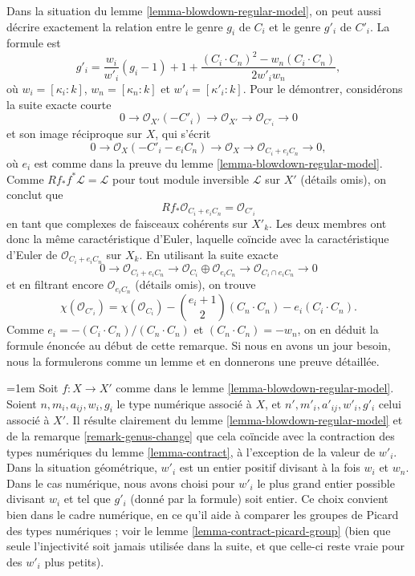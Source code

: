 \begin{remark}
\label{remark-genus-change}
Dans la situation du lemme \ref{lemma-blowdown-regular-model}, on peut aussi
décrire exactement la relation entre le genre $g_i$ de $C_i$ et le genre
$g'_i$ de $C'_i$. La formule est
$$
g'_i = \frac{w_i}{w'_i}(g_i - 1) + 1 +
\frac{(C_i \cdot C_n)^2 - w_n(C_i \cdot C_n)}{2w'_iw_n},
$$
où $w_i = [\kappa_i : k]$, $w_n = [\kappa_n : k]$ et
$w'_i = [\kappa'_i : k]$.
Pour le démontrer, considérons la suite exacte courte
$$
0 \to \mathcal{O}_{X'}(-C'_i) \to \mathcal{O}_{X'} \to
\mathcal{O}_{C'_i} \to 0
$$
et son image réciproque sur $X$, qui s'écrit
$$
0 \to \mathcal{O}_X(-C'_i - e_iC_n) \to \mathcal{O}_X \to
\mathcal{O}_{C_i + e_iC_n} \to 0,
$$
où $e_i$ est comme dans la preuve du lemme
\ref{lemma-blowdown-regular-model}. Comme
$Rf_*f^*\mathcal{L} = \mathcal{L}$ pour tout module inversible
$\mathcal{L}$ sur $X'$ (détails omis), on conclut que
$$
Rf_*\mathcal{O}_{C_i + e_iC_n} = \mathcal{O}_{C'_i}
$$
en tant que complexes de faisceaux cohérents sur $X'_k$.
Les deux membres ont donc la même caractéristique d'Euler, laquelle coïncide
avec la caractéristique d'Euler de $\mathcal{O}_{C_i + e_iC_n}$ sur $X_k$.
En utilisant la suite exacte
$$
0 \to \mathcal{O}_{C_i + e_iC_n} \to
\mathcal{O}_{C_i} \oplus \mathcal{O}_{e_iC_n} \to
\mathcal{O}_{C_i \cap e_iC_n} \to 0
$$
et en filtrant encore $\mathcal{O}_{e_iC_n}$ (détails omis), on trouve
$$
\chi(\mathcal{O}_{C'_i}) =
\chi(\mathcal{O}_{C_i}) - {e_i + 1 \choose 2}(C_n \cdot C_n)
- e_i(C_i \cdot C_n).
$$
Comme $e_i = -(C_i \cdot C_n)/(C_n \cdot C_n)$ et
$(C_n \cdot C_n) = -w_n$, on en déduit la formule énoncée au début de
cette remarque. Si nous en avons un jour besoin, nous la formulerons comme
un lemme et en donnerons une preuve détaillée.
\end{remark}

\begin{remark}
\label{remark-compare-contractions}
\begingroup
\emergencystretch=1em
Soit $f : X \to X'$ comme dans le lemme
\ref{lemma-blowdown-regular-model}. Soient $n,\allowbreak{}m_i,\allowbreak{}a_{ij},\allowbreak{}w_i,\allowbreak{}g_i$ le type
numérique associé à $X$, et $n',\allowbreak{}m'_i,\allowbreak{}a'_{ij},\allowbreak{}w'_i,\allowbreak{}g'_i$ celui associé à
$X'$. Il résulte clairement du lemme \ref{lemma-blowdown-regular-model} et
de la remarque \ref{remark-genus-change} que cela coïncide avec la
contraction des types numériques du lemme \ref{lemma-contract}, à
l'exception de la valeur de $w'_i$. Dans la situation géométrique, $w'_i$
est un entier positif divisant à la fois $w_i$ et $w_n$. Dans le cas
numérique, nous avons choisi pour $w'_i$ le plus grand entier possible
divisant $w_i$ et tel que $g'_i$ (donné par la formule) soit entier.
Ce choix convient bien dans le cadre numérique, en ce qu'il aide à comparer
les groupes de Picard des types numériques ; voir le lemme
\ref{lemma-contract-picard-group} (bien que seule l'injectivité soit jamais
utilisée dans la suite, et que celle-ci reste vraie pour des $w'_i$ plus
petits).
\par
\endgroup
\end{remark}


